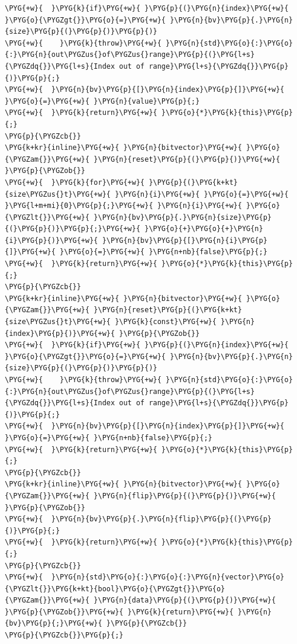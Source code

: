 \begin{codeblockbg}
\begin{Verbatim}[commandchars=\\\{\},breaklines=true,breakanywhere=true,fontsize=\codefont,xleftmargin=17bp]
\PYG{+w}{  }\PYG{k}{if}\PYG{+w}{ }\PYG{p}{(}\PYG{n}{index}\PYG{+w}{ }\PYG{o}{\PYGZgt{}}\PYG{o}{=}\PYG{+w}{ }\PYG{n}{bv}\PYG{p}{.}\PYG{n}{size}\PYG{p}{(}\PYG{p}{)}\PYG{p}{)}
\PYG{+w}{    }\PYG{k}{throw}\PYG{+w}{ }\PYG{n}{std}\PYG{o}{:}\PYG{o}{:}\PYG{n}{out\PYGZus{}of\PYGZus{}range}\PYG{p}{(}\PYG{l+s}{\PYGZdq{}}\PYG{l+s}{Index out of range}\PYG{l+s}{\PYGZdq{}}\PYG{p}{)}\PYG{p}{;}
\PYG{+w}{  }\PYG{n}{bv}\PYG{p}{[}\PYG{n}{index}\PYG{p}{]}\PYG{+w}{ }\PYG{o}{=}\PYG{+w}{ }\PYG{n}{value}\PYG{p}{;}
\PYG{+w}{  }\PYG{k}{return}\PYG{+w}{ }\PYG{o}{*}\PYG{k}{this}\PYG{p}{;}
\PYG{p}{\PYGZcb{}}
\PYG{k+kr}{inline}\PYG{+w}{ }\PYG{n}{bitvector}\PYG{+w}{ }\PYG{o}{\PYGZam{}}\PYG{+w}{ }\PYG{n}{reset}\PYG{p}{(}\PYG{p}{)}\PYG{+w}{ }\PYG{p}{\PYGZob{}}
\PYG{+w}{  }\PYG{k}{for}\PYG{+w}{ }\PYG{p}{(}\PYG{k+kt}{size\PYGZus{}t}\PYG{+w}{ }\PYG{n}{i}\PYG{+w}{ }\PYG{o}{=}\PYG{+w}{ }\PYG{l+m+mi}{0}\PYG{p}{;}\PYG{+w}{ }\PYG{n}{i}\PYG{+w}{ }\PYG{o}{\PYGZlt{}}\PYG{+w}{ }\PYG{n}{bv}\PYG{p}{.}\PYG{n}{size}\PYG{p}{(}\PYG{p}{)}\PYG{p}{;}\PYG{+w}{ }\PYG{o}{+}\PYG{o}{+}\PYG{n}{i}\PYG{p}{)}\PYG{+w}{ }\PYG{n}{bv}\PYG{p}{[}\PYG{n}{i}\PYG{p}{]}\PYG{+w}{ }\PYG{o}{=}\PYG{+w}{ }\PYG{n+nb}{false}\PYG{p}{;}
\PYG{+w}{  }\PYG{k}{return}\PYG{+w}{ }\PYG{o}{*}\PYG{k}{this}\PYG{p}{;}
\PYG{p}{\PYGZcb{}}
\PYG{k+kr}{inline}\PYG{+w}{ }\PYG{n}{bitvector}\PYG{+w}{ }\PYG{o}{\PYGZam{}}\PYG{+w}{ }\PYG{n}{reset}\PYG{p}{(}\PYG{k+kt}{size\PYGZus{}t}\PYG{+w}{ }\PYG{k}{const}\PYG{+w}{ }\PYG{n}{index}\PYG{p}{)}\PYG{+w}{ }\PYG{p}{\PYGZob{}}
\PYG{+w}{  }\PYG{k}{if}\PYG{+w}{ }\PYG{p}{(}\PYG{n}{index}\PYG{+w}{ }\PYG{o}{\PYGZgt{}}\PYG{o}{=}\PYG{+w}{ }\PYG{n}{bv}\PYG{p}{.}\PYG{n}{size}\PYG{p}{(}\PYG{p}{)}\PYG{p}{)}
\PYG{+w}{    }\PYG{k}{throw}\PYG{+w}{ }\PYG{n}{std}\PYG{o}{:}\PYG{o}{:}\PYG{n}{out\PYGZus{}of\PYGZus{}range}\PYG{p}{(}\PYG{l+s}{\PYGZdq{}}\PYG{l+s}{Index out of range}\PYG{l+s}{\PYGZdq{}}\PYG{p}{)}\PYG{p}{;}
\PYG{+w}{  }\PYG{n}{bv}\PYG{p}{[}\PYG{n}{index}\PYG{p}{]}\PYG{+w}{ }\PYG{o}{=}\PYG{+w}{ }\PYG{n+nb}{false}\PYG{p}{;}
\PYG{+w}{  }\PYG{k}{return}\PYG{+w}{ }\PYG{o}{*}\PYG{k}{this}\PYG{p}{;}
\PYG{p}{\PYGZcb{}}
\PYG{k+kr}{inline}\PYG{+w}{ }\PYG{n}{bitvector}\PYG{+w}{ }\PYG{o}{\PYGZam{}}\PYG{+w}{ }\PYG{n}{flip}\PYG{p}{(}\PYG{p}{)}\PYG{+w}{ }\PYG{p}{\PYGZob{}}
\PYG{+w}{  }\PYG{n}{bv}\PYG{p}{.}\PYG{n}{flip}\PYG{p}{(}\PYG{p}{)}\PYG{p}{;}
\PYG{+w}{  }\PYG{k}{return}\PYG{+w}{ }\PYG{o}{*}\PYG{k}{this}\PYG{p}{;}
\PYG{p}{\PYGZcb{}}
\PYG{+w}{  }\PYG{n}{std}\PYG{o}{:}\PYG{o}{:}\PYG{n}{vector}\PYG{o}{\PYGZlt{}}\PYG{k+kt}{bool}\PYG{o}{\PYGZgt{}}\PYG{o}{\PYGZam{}}\PYG{+w}{ }\PYG{n}{data}\PYG{p}{(}\PYG{p}{)}\PYG{+w}{ }\PYG{p}{\PYGZob{}}\PYG{+w}{ }\PYG{k}{return}\PYG{+w}{ }\PYG{n}{bv}\PYG{p}{;}\PYG{+w}{ }\PYG{p}{\PYGZcb{}}
\PYG{p}{\PYGZcb{}}\PYG{p}{;}
\end{Verbatim}
\end{codeblockbg}


